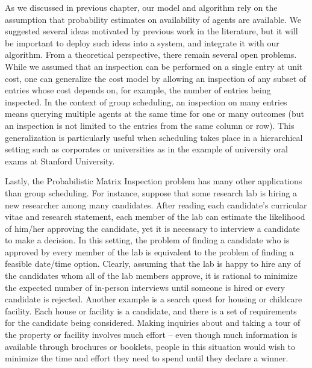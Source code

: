 As we discussed in previous chapter, our model and algorithm rely on the assumption that probability estimates on availability of agents are available. We suggested several ideas motivated by previous work in the literature, but it will be important to deploy such ideas into a system, and integrate it with our algorithm. From a theoretical perspective, there remain several open problems. While we assumed that an inspection can be performed on a single entry at unit cost, one can generalize the cost model by allowing an inspection of any subset of entries whose cost depends on, for example, the number of entries being inspected. In the context of group scheduling, an inspection on many entries means querying multiple agents at the same time for one or many outcomes (but an inspection is not limited to the entries from the same column or row). This generalization is particularly useful when scheduling takes place in a hierarchical setting such as corporates or universities as in the example of  university oral exams at Stanford University.

Lastly, the Probabilistic Matrix Inspection problem has many other applications than group scheduling. 
For instance, suppose that some research lab is hiring a new researcher among many candidates.
After reading each candidate's curricular vitae and research statement,
each member of the lab can estimate the likelihood of him/her approving the candidate, yet it is necessary to interview a candidate to make a decision.
In this setting, the problem of finding a candidate who is approved by every member of the lab is equivalent to the problem of finding a feasible date/time option. Clearly, assuming that the lab is happy to hire any of the candidates whom all of the lab members approve, it is rational to minimize the expected number of in-person interviews until someone is hired or every candidate is rejected.
Another example is a search quest for housing or childcare facility.
Each house or facility is a candidate, and there is a set of requirements for the candidate being considered. Making inquiries about and taking a tour of the property or facility involves much effort -- even though much information is available through brochures or booklets, people in this situation would wish to minimize the time and effort they need to spend until they declare a winner.


